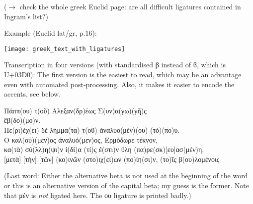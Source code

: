 ($\to$ check the whole greek Euclid page: are all difficult ligatures contained in Ingram's list?)

Example (Euclid lat/gr, p.16):

\texttt{[image: greek\_text\_with\_ligatures]} 

Transcription in four versions (with standardised β instead of ϐ, which is U+03D0): The first version is the easiest to read, which may be an advantage even with automated post-processing. Also, it makes it easier to encode the accents, see below.



\begin{typeGreek}
Πάππ(ου) τ(οῦ) Αλεξαν(δρ)έως Σ(υν)α(γω)(γῆ)ς \\ 
ἓβ(δο)(μο)ν. \\ 
Πε(ρι)έχ(ει) δὲ λήμμα(τα) τ(οῦ) ἀναλυο(μέν)(ου) (τό)(πο)υ. \\ 
Ο καλ(ού)(μεν)ος ἀναλυό(μεν)ος, Ερμόδωρε τέκνον, \\ 
κα(τὰ) σύ(λλ)η(ψι)ν ἰ(δί)α (τί)ς ἐ(στι)ν ὓλη (πα)ρε(σκ)[ευ]ασ(μέν)η, \\{}
[μετὰ] [τὴν] [τῶν] (κο)ινῶν (στο)ιχ(εί)ων (πο)ίη(σι)ν, (το)ῖς β(ου)λομένοις \\ 
\end{typeGreek}

(Last word: Either the alternative beta is not used at the beginning of the word or this is an alternative version of the capital beta; my guess is the former. Note that μέν is \emph{not} ligated here. The ου ligature is printed badly.)

